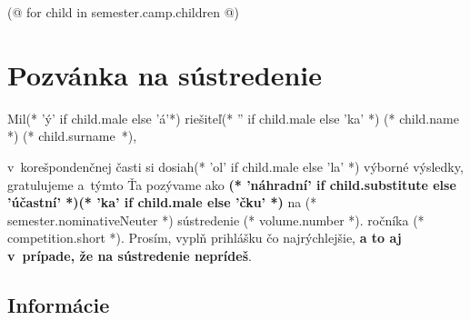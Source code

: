 \documentclass[12pt, twoside]{article}
\begin{document}
    \pagestyle{main-(* competition.id *)}
    
    (@ for child in semester.camp.children @)
    \thispagestyle{first-(* competition.id *)-(* volume.id *)-(* semester.id *)}
    \vspace*{8mm}
    \section{Pozvánka na sústredenie}
        Mil(* 'ý' if child.male else 'á'*) riešiteľ(* '' if child.male else 'ka' *) (* child.name *) (* child.surname *),

        v~korešpondenčnej časti si dosiah(* 'ol' if child.male else 'la' *) výborné výsledky,
        gratulujeme a~týmto Ťa pozývame ako \textbf{(* 'náhradní' if child.substitute else 'účastní' *)(* 'ka' if child.male else 'čku' *)}
        na (* semester.nominativeNeuter *) sústredenie (* volume.number *). ročníka (* competition.short *).
        Prosím, vyplň prihlášku čo najrýchlejšie, \textbf{a to aj v~prípade, že na sústredenie neprídeš}.

    \subsection{Informácie}
\end{document}
